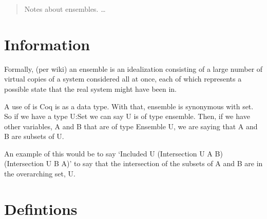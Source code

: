 \documentclass[12pt]{article}
\begin{document}
\maketitle

\begin{abstract}
Notes about ensembles. \ldots
\end{abstract}

\section{Information}

Formally, (per wiki) an ensemble is an idealization consisting of a large number of virtual copies of a system considered all at once, each of which represents a possible state that the real system might have been in.

A use of  is Coq is as a data type. With that, ensemble is synonymous with set. So if we have a type U:Set we can say U is of type ensemble. Then, if we have other variables, A and B that are of type Ensemble U, we are saying that A and B are subsets of U.   

An example of this would be to say `Included U (Intersection U A B) (Intersection U B A)' to say that the intersection of the subsets of A and B are in the overarching set, U.

\section{Defintions}



\end{document}
